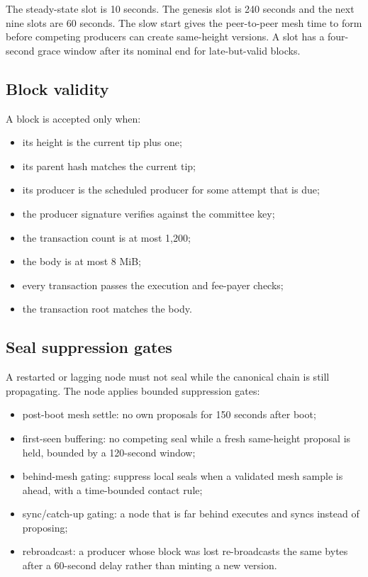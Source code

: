 \documentclass[11pt,a4paper]{article}
\begin{document}
The steady-state slot is 10 seconds. The genesis slot is 240 seconds and the
next nine slots are 60 seconds. The slow start gives the peer-to-peer mesh time
to form before competing producers can create same-height versions. A slot has
a four-second grace window after its nominal end for late-but-valid blocks.

\subsection{Block validity}

A block is accepted only when:
\begin{itemize}[leftmargin=*]
  \item its height is the current tip plus one;
  \item its parent hash matches the current tip;
  \item its producer is the scheduled producer for some attempt that is due;
  \item the producer signature verifies against the committee key;
  \item the transaction count is at most 1,200;
  \item the body is at most 8 MiB;
  \item every transaction passes the execution and fee-payer checks;
  \item the transaction root matches the body.
\end{itemize}

\subsection{Seal suppression gates}

A restarted or lagging node must not seal while the canonical chain is still
propagating. The node applies bounded suppression gates:
\begin{itemize}[leftmargin=*]
  \item post-boot mesh settle: no own proposals for 150 seconds after boot;
  \item first-seen buffering: no competing seal while a fresh same-height
        proposal is held, bounded by a 120-second window;
  \item behind-mesh gating: suppress local seals when a validated mesh sample
        is ahead, with a time-bounded contact rule;
  \item sync/catch-up gating: a node that is far behind executes and syncs
        instead of proposing;
  \item rebroadcast: a producer whose block was lost re-broadcasts the same
        bytes after a 60-second delay rather than minting a new version.
\end{itemize}
\end{document}
